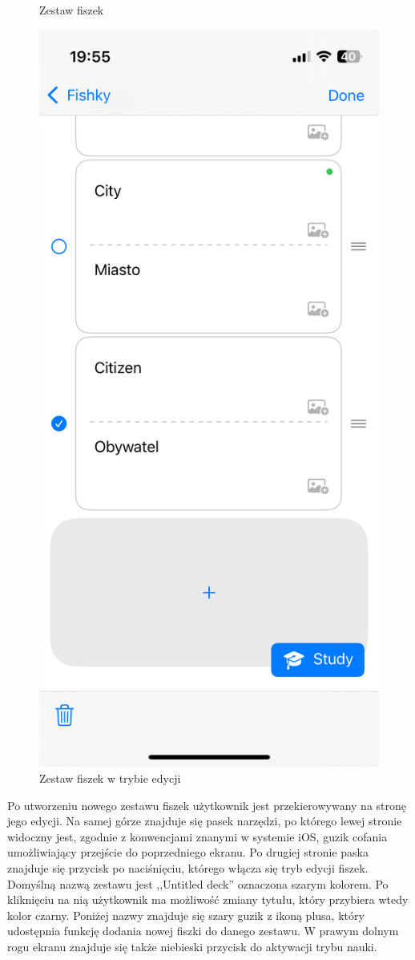 \documentclass[final,a4paper,openany,12pt]{mwbk}
\begin{document}
\begin{figure}[h]
\begin{minipage}{0.5\textwidth}
  \caption{Zestaw fiszek}
  \label{fig:fishky3}
\end{minipage}%
\begin{minipage}{0.5\textwidth}
  \centering
  \includegraphics[width=.75\linewidth]{img/fishky4.PNG}
  \caption{Zestaw fiszek w trybie edycji}
  \label{fig:fishky4}
\end{minipage}
\end{figure}

Po utworzeniu nowego zestawu fiszek użytkownik jest przekierowywany na stronę jego edycji. Na samej górze znajduje się pasek narzędzi, po którego lewej stronie widoczny jest, zgodnie z konwencjami znanymi w systemie iOS, guzik cofania umożliwiający przejście do poprzedniego ekranu. Po drugiej stronie paska znajduje się przycisk po naciśnięciu, którego włącza się tryb edycji fiszek. Domyślną nazwą zestawu jest ,,Untitled deck'' oznaczona szarym kolorem. Po kliknięciu na nią użytkownik ma możliwość zmiany tytułu, który przybiera wtedy kolor czarny. Poniżej nazwy znajduje się szary guzik z ikoną plusa, który udostępnia funkcję dodania nowej fiszki do danego zestawu. W prawym dolnym rogu ekranu znajduje się także niebieski przycisk do aktywacji trybu nauki.
\end{document}
